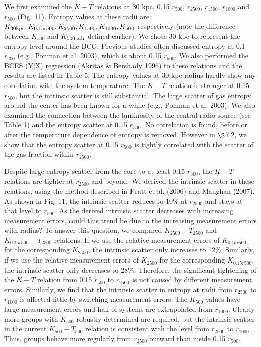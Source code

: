\documentclass{aastex}
\begin{document}
We first examined the $K - T$ relations at 30 kpc, 0.15 $r_{500}$, $r_{2500}$,
$r_{1500}$, $r_{1000}$ and $r_{500}$ (Fig. 11). Entropy values at these radii are:
$K_{\rm 30 kpc}, K_{\rm 0.15 r500}, K_{2500}, K_{1500}, K_{1000}, K_{500}$
respectively (note the difference between $K_{500}$ and $K_{\rm 500, adi}$
defined earlier). We chose 30 kpc to represent the entropy level around the BCG.
Previous studies often discussed entropy at 0.1 $r_{200}$ (e.g., Ponman et al. 2003),
which is about 0.15 $r_{500}$. We also performed the BCES (Y$|$X) regression
(Akritas \& Bershady 1996) to these relations and the results are listed in Table 5. 
The entropy values at 30 kpc radius hardly show any correlation with the system
temperature. The $K - T$ relation is stronger at 0.15 $r_{500}$, but the
intrinsic scatter is still substantial. The large scatter of gas entropy
around the center has been known for a while (e.g., Ponman et al. 2003).
We also examined the connection between the luminosity of the
central radio source (see Table 1) and the
entropy scatter at 0.15 $r_{500}$. No correlation is found, before or after the
temperature dependence of entropy is removed. However in $\S$7.2, we show that
the entropy scatter at 0.15 $r_{500}$ is tightly correlated with the scatter of
the gas fraction within $r_{2500}$.

Despite large entropy scatter from the core to at least 0.15 $r_{500}$,
the $K - T$ relations are tighter at $r_{2500}$ and beyond.
We derived the intrinsic scatter in these relations,
using the method described in Pratt et al. (2006) and Maughan (2007). As shown
in Fig. 11, the intrinsic scatter reduces to 10\% at $r_{2500}$ and stays at that
level to $r_{500}$. As the derived intrinsic scatter decreases with 
increasing measurement errors, could this trend be due to the increasing
measurement errors with radius? To answer this question,
we compared $K_{2500} - T_{2500}$ and $K_{0.15 r500} - T_{2500}$ relations.
If we use the relative measurement errors of $K_{0.15 r500}$ for the corresponding
$K_{2500}$, the intrinsic scatter only increases to 12\%. Similarly, if we use the
relative measurement errors of $K_{2500}$ for the corresponding $K_{0.15 r500}$, the
intrinsic scatter only decreases to 28\%. Therefore, the significant tightening of the
$K - T$ relation from 0.15 $r_{500}$ to $r_{2500}$ is not caused by different measurement
errors. Similarly, we find that the intrinsic scatter in entropy at radii from
$r_{2500}$ to $r_{1000}$ is affected little by switching measurement errors.
The $K_{500}$ values have large measurement errors and half of systems
are extrapolated from $r_{1000}$. Clearly more groups with $K_{500}$ robustly determined
are required, but the intrinsic scatter in the current $K_{500} - T_{500}$ relation is
consistent with the level from $r_{2500}$ to $r_{1000}$.
Thus, groups behave more regularly from $r_{2500}$ outward than inside 0.15 $r_{500}$.
\end{document}
